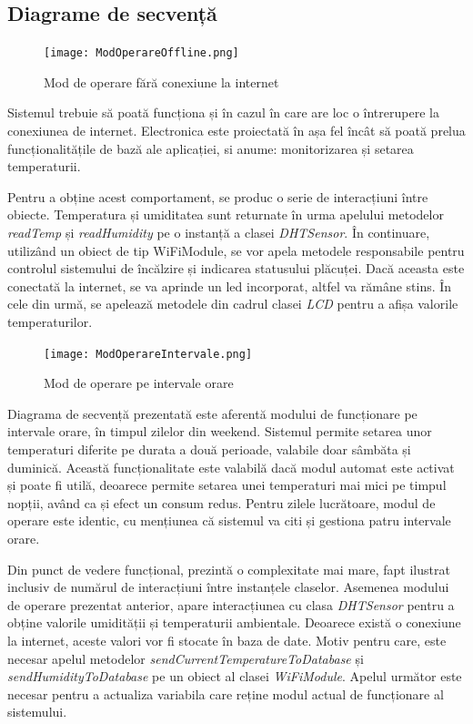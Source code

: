 \subsection{Diagrame de secvență}

\begin{figure}[H]
   	\centering
    	\texttt{[image: ModOperareOffline.png]}
	\caption{Mod de operare fără conexiune la internet}
\end{figure}

	Sistemul trebuie să poată funcționa și în cazul în care are loc o întrerupere la conexiunea de internet. Electronica este proiectată în așa fel încât să poată prelua funcționalitățile de bază ale aplicației, si anume: monitorizarea și setarea temperaturii.
	
	Pentru a obține acest comportament, se produc o serie de interacțiuni între obiecte. Temperatura și umiditatea sunt returnate în urma apelului metodelor \textit{readTemp} și \textit{readHumidity} pe o instanță a clasei \textit{DHTSensor}. În continuare, utilizând un obiect de tip WiFiModule, se vor apela metodele responsabile pentru controlul sistemului de încălzire și indicarea statusului plăcuței. Dacă aceasta este conectată la internet, se va aprinde un led incorporat, altfel va rămâne stins. În cele din urmă, se apelează metodele din cadrul clasei \textit{LCD} pentru a afișa valorile temperaturilor.

\begin{figure}[H]
   	\centering
    	\texttt{[image: ModOperareIntervale.png]}
	\caption{Mod de operare pe intervale orare}
\end{figure}

	Diagrama de secvență prezentată este aferentă modului de funcționare pe intervale orare, în timpul zilelor din weekend. Sistemul permite setarea unor temperaturi diferite pe durata a două perioade, valabile doar sâmbăta și duminică. Această funcționalitate este valabilă dacă modul automat este activat și poate fi utilă, deoarece permite setarea unei temperaturi mai mici pe timpul nopții, având ca și efect un consum redus. Pentru zilele lucrătoare, modul de operare este identic, cu mențiunea că sistemul va citi și gestiona patru intervale orare.

	Din punct de vedere funcțional, prezintă o complexitate mai mare, fapt ilustrat inclusiv de numărul de interacțiuni între instanțele claselor. Asemenea modului de operare prezentat anterior, apare interacțiunea cu clasa \textit{DHTSensor} pentru a obține valorile umidității și temperaturii ambientale. Deoarece există o conexiune la internet, aceste valori vor fi stocate în baza de date. Motiv pentru care, este necesar apelul metodelor \textit{sendCurrentTemperatureToDatabase} și \textit{sendHumidityToDatabase} pe un obiect al clasei \textit{WiFiModule}. Apelul următor este necesar pentru a actualiza variabila care reține modul actual de funcționare al sistemului. 

